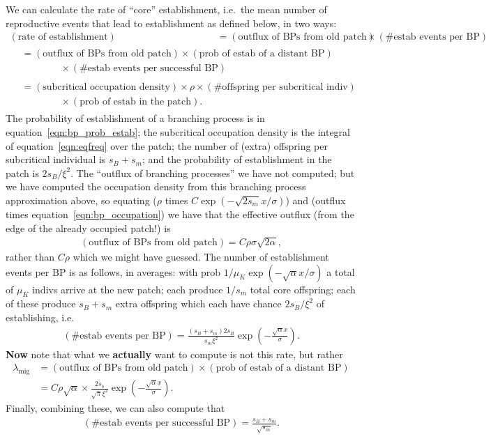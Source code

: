 \documentclass{article}
\newcommand{\migrate}{\lambda_\text{mig}}
\begin{document}
We can calculate the rate of ``core'' establishment, i.e.\ the mean number of reproductive events that lead to establishment as defined below, in two ways:
\begin{align}
  (\mbox{rate of establishment}) &= (\mbox{outflux of BPs from old patch}) \times (\mbox{\# estab events per BP}) \\
    \begin{split} &= (\mbox{outflux of BPs from old patch}) \times (\mbox{prob of estab of a distant BP}) \\
  & \qquad \qquad \times (\mbox{\# estab events per successful BP}) \end{split} \\
  \begin{split} &= (\mbox{subcritical occupation density}) \times \rho \times (\mbox{\# offspring per subcritical indiv}) \\
    & \qquad \qquad \times (\mbox{prob of estab in the patch}) . \end{split} 
\end{align}
The probability of establishment of a branching process is in equation~\eqref{eqn:bp_prob_estab};
the subcritical occupation density is the integral of equation~\eqref{eqn:eqfreq} over the patch;
the number of (extra) offspring per subcritical individual is $s_B+s_m$;
and the probability of establishment in the patch is $2s_B/\xi^2$.
The ``outflux of branching processes'' we have not computed;
but we have computed the occupation density from this branching process approximation above,
so equating ($\rho$ times $C\exp(-\sqrt{2 s_m}x/\sigma)$) and (outflux times equation~\eqref{eqn:bp_occupation})
we have that the effective outflux (from the edge of the already occupied patch!) is 
\begin{align}
  (\mbox{outflux of BPs from old patch}) = C \rho \sigma \sqrt{2 \alpha} ,
\end{align}
rather than $C\rho$ which we might have guessed.
The number of establishment events per BP is as follows, in averages: 
with prob $1/\mu_K \exp(-\sqrt{\alpha} x/ \sigma)$ a total of $\mu_K$ indivs arrive at the new patch; 
each produce $1/s_m$ total core offspring;
each of these produce $s_B+s_m$ extra offspring which each have chance $2s_B/\xi^2$ of establishing,
i.e.
\begin{align}
  (\mbox{\# estab events per BP}) = \frac{(s_B+s_m) 2 s_B }{ s_m \xi^2 } \exp\left(-\frac{\sqrt{\alpha} x}{\sigma}\right) .
\end{align}
\textbf{Now} note that what we \textbf{actually} want to compute is not this rate, but rather 
\begin{align}
  \migrate &= (\mbox{outflux of BPs from old patch}) \times (\mbox{prob of estab of a distant BP}) \\
  &= C \rho \sqrt{\alpha} \times \frac{2 s_b}{\sqrt{\pi} \xi^2} \exp\left(- \frac{\sqrt{\alpha}x}{\sigma} \right) .
\end{align}
Finally, combining these, we can also compute that
\begin{align}
  (\mbox{\# estab events per successful BP}) = \frac{s_B+s_m}{ \sqrt{s_m} } .
\end{align}
\end{document}
